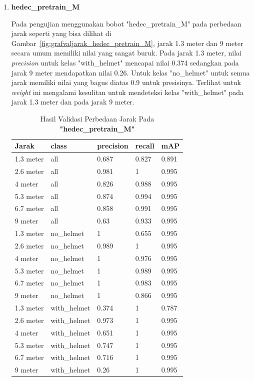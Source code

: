 \begin{enumerate}
  \FloatBarrier
  
   
  \item \textbf{hedec\_pretrain\_M}
  
  \par Pada pengujian menggunakan bobot "hedec\_pretrain\_M" pada perbedaan jarak seperti yang bisa dilihat di Gambar~\ref{fig:grafvaljarak_hedec_pretrain_M}, jarak 1.3 meter dan 9 meter
  secara umum memiliki nilai yang sangat buruk. Pada jarak 1.3 meter, nilai \emph{precision} untuk kelas "with\_helmet"
  mencapai nilai 0.374 sedangkan pada jarak 9 meter mendapatkan nilai 0.26. Untuk kelas "no\_helmet" untuk semua jarak memiliki
  nilai yang bagus diatas 0.9 untuk presisinya. Terlihat untuk \emph{weight} ini mengalami kesulitan untuk mendeteksi
  kelas "with\_helmet" pada jarak 1.3 meter dan pada jarak 9 meter.


  \begin{longtable}{|l|l|l|l|l|} 
    \caption{Hasil Validasi Perbedaan Jarak Pada \textbf{"hedec\_pretrain\_M"}}
    \label{tb:hasiljarak_hedec_pretrain_M}\\
    \hline
    Jarak     & class        & precision & recall & mAP    \\ 
    \hline
    \endhead
    1.3 meter & all          & 0.687     & 0.827  & 0.891  \\
    2.6 meter & all          & 0.981     & 1      & 0.995  \\
    4 meter   & all          & 0.826     & 0.988  & 0.995  \\
    5.3 meter & all          & 0.874     & 0.994  & 0.995  \\
    6.7 meter & all          & 0.858     & 0.991  & 0.995  \\
    9 meter   & all          & 0.63      & 0.933  & 0.995  \\
    1.3 meter & no\_helmet   & 1         & 0.655  & 0.995  \\
    2.6 meter & no\_helmet   & 0.989     & 1      & 0.995  \\
    4 meter   & no\_helmet   & 1         & 0.976  & 0.995  \\
    5.3 meter & no\_helmet   & 1         & 0.989  & 0.995  \\
    6.7 meter & no\_helmet   & 1         & 0.983  & 0.995  \\
    9 meter   & no\_helmet   & 1         & 0.866  & 0.995  \\
    1.3 meter & with\_helmet & 0.374     & 1      & 0.787  \\
    2.6 meter & with\_helmet & 0.973     & 1      & 0.995  \\
    4 meter   & with\_helmet & 0.651     & 1      & 0.995  \\
    5.3 meter & with\_helmet & 0.747     & 1      & 0.995  \\
    6.7 meter & with\_helmet & 0.716     & 1      & 0.995  \\
    9 meter   & with\_helmet & 0.26      & 1      & 0.995  \\
    \hline
  \end{longtable}


\end{enumerate}
